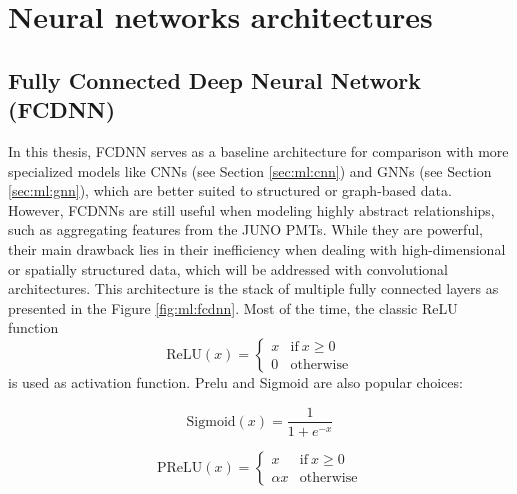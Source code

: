 \documentclass[../main.tex]{subfiles}
\begin{document}
\section{Neural networks architectures}
\label{sec:ml:architecture}

\subsection{Fully Connected Deep Neural Network (FCDNN)}
\label{sec:ml:fcdnn}

In this thesis, FCDNN serves as a baseline architecture for comparison with more specialized models like CNNs (see Section \ref{sec:ml:cnn}) and GNNs (see Section \ref{sec:ml:gnn}), which are better suited to structured or graph-based data. However, FCDNNs are still useful when modeling highly abstract relationships, such as aggregating features from the JUNO PMTs. While they are powerful, their main drawback lies in their inefficiency when dealing with high-dimensional or spatially structured data, which will be addressed with convolutional architectures.
This architecture is the stack of multiple fully connected layers as presented in the Figure \ref{fig:ml:fcdnn}. Most of the time, the classic ReLU function
\begin{equation}
  \label{eq:ml:relu}
  \mathrm{ReLU}(x) = \begin{cases}
    x & \mathrm{if} ~ x \geq 0 \\
    0 & \mathrm{otherwise}
  \end{cases}
\end{equation}
is used as activation function. Prelu and Sigmoid are also popular choices:


\begin{minipage}{0.5\linewidth}
  \begin{equation}
    \label{sec:ml:sigmoid}
    \mathrm{Sigmoid}(x) = \frac{1}{1+ e^{-x}}
  \end{equation}
\end{minipage}
\begin{minipage}{0.5\linewidth}
  \begin{equation}
    \label{sec:ml:prelu}
    \mathrm{PReLU}(x) = \begin{cases}
      x & \mathrm{if} ~ x \geq 0 \\
      \alpha x & \mathrm{otherwise}
    \end{cases}
  \end{equation}
\end{minipage}
\end{document}
